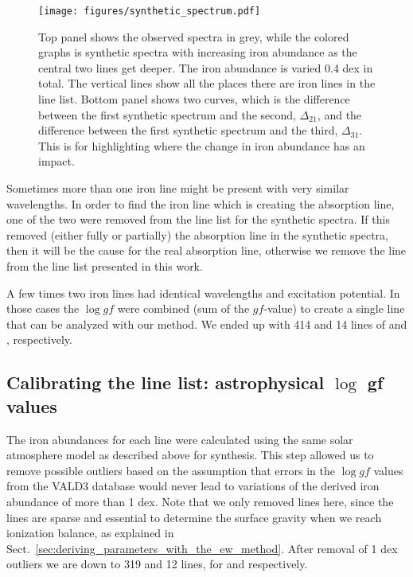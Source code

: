 \documentclass{aa}
\begin{document}
\begin{figure}[tpb]
    \centering
    \texttt{[image: figures/synthetic\_spectrum.pdf]}
    \caption{Top panel shows the observed spectra in grey, while
        the colored graphs is synthetic spectra with increasing iron
        abundance as the central two lines get deeper. The iron abundance
        is varied 0.4 dex in total. The vertical lines show all the places
        there are iron lines in the line list. Bottom panel shows
        two curves, which is the difference between the first synthetic
        spectrum and the second, $\Delta_{21}$, and the difference
        between the first synthetic spectrum and the third, $\Delta_{31}$.
        This is for highlighting where the change in iron
        abundance has an impact.}
    \label{fig:synthesis}
\end{figure}


Sometimes more than one iron line might be present with very similar
wavelengths. In order to find the iron line which is creating the
absorption line, one of the two were removed from the line list for
the synthetic spectra. If this removed (either fully or partially) the
absorption line in the synthetic spectra, then it will be the cause for
the real absorption line, otherwise we remove the line from the line
list presented in this work.

A few times two iron lines had identical wavelengths and excitation
potential. In those cases the $\log \mathit{gf}$ were combined (sum
of the $\mathit{gf}$-value) to create a single line that can be analyzed with
our method. We ended up with 414 and 14 lines of  and
, respectively.


\subsection{Calibrating the line list: astrophysical $\log$ gf values}
\label{ssub:Recalibrating-the-atomic-data}

The iron abundances for each line were calculated using the same
solar atmosphere model as described above for synthesis. This step
allowed us to remove possible outliers based on the assumption that
errors in the $\log \mathit{gf}$ values from the VALD3 database
would never lead to variations of the derived iron abundance of more
than 1 dex. Note that we only removed  lines here, since
the  lines are sparse and essential to determine the
surface gravity when we reach ionization balance, as explained in
Sect.~\ref{sec:deriving_parameters_with_the_ew_method}. After removal
of 1 dex outliers
we are down to 319 and 12 lines, for  and 
respectively.
\end{document}
